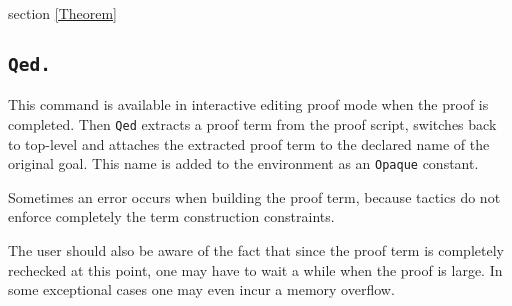\begin{ErrMsgs}
\item {}
\end{ErrMsgs}

\SeeAlso section \ref{Theorem}

\subsection[\tt Qed.]{\tt Qed.\label{Qed}}
This command is available in interactive editing proof mode when the
proof is completed.  Then {\tt Qed} extracts a proof term from the
proof script, switches back to {\Coq} top-level and attaches the
extracted proof term to the declared name of the original goal. This
name is added to the environment as an {\tt Opaque} constant.

\begin{ErrMsgs}
\item {}
\item Sometimes an error occurs when building the proof term,
because tactics do not enforce completely the term construction
constraints.

The user should also be aware of the fact that since the proof term is
completely rechecked at this point, one may have to wait a while when
the proof is large. In some exceptional cases one may even incur a
memory overflow.
\end{ErrMsgs}


